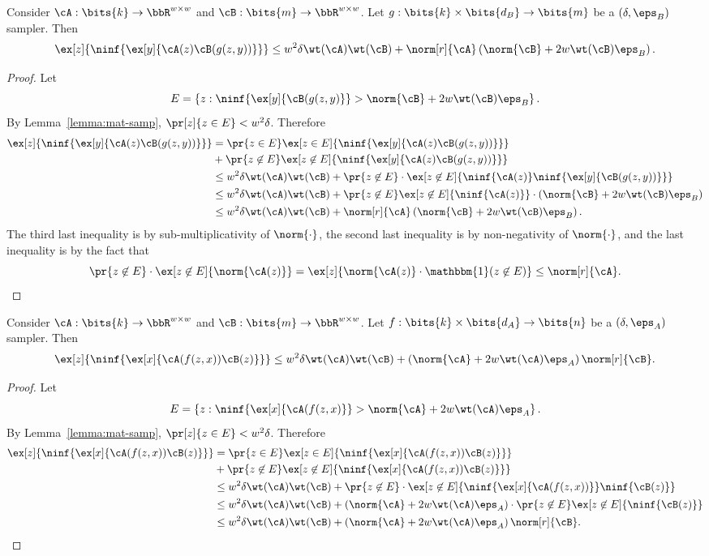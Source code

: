 \begin{lemma}\label{lemma:left}
Consider $\cA:\bits{k}\to\bbR^{w\times w}$ and $\cB:\bits{m}\to\bbR^{w\times w}$. Let $g:\bits{k}\times \bits{d_B}\to\bits{m}$ be a $(\delta,\eps_B)$ sampler. Then 
$$\ex[z]{\ninf{\ex[y]{\cA(z)\cB(g(z,y))}}}\le w^2\delta \wt(\cA)\wt(\cB)+\norm[r]{\cA}\left(\norm{\cB}+2w\wt(\cB)\eps_B\right).$$
\end{lemma}
\begin{proof}
Let $$E=\left\{z: \ninf{\ex[y]{\cB(g(z,y)}}> \norm{\cB}+2w\wt(\cB)\eps_B\right\}.$$
By Lemma~\ref{lemma:mat-samp}, $\pr[z]{z\in E}<w^2\delta$. Therefore 
\begin{align*}
\ex[z]{\ninf{\ex[y]{\cA(z)\cB(g(z,y))}}}
&=\pr{z\in E}\ex[z\in E]{\ninf{\ex[y]{\cA(z)\cB(g(z,y))}}} \\
&+ \pr{z\not\in E}\ex[z\not\in E]{\ninf{\ex[y]{\cA(z)\cB(g(z,y))}}}\\
&\le w^2\delta \wt(\cA)\wt(\cB)+\pr{z\not\in E}\cdot\ex[z\not\in E]{\ninf{\cA(z)}\ninf{\ex[y]{\cB(g(z,y))}}}\\
&\le w^2\delta \wt(\cA)\wt(\cB)+\pr{z\not\in E}\ex[z\not\in E]{\ninf{\cA(z)}}\cdot(\norm{\cB}+2w\wt(\cB)\eps_B)\\
&\le w^2\delta \wt(\cA)\wt(\cB)+\norm[r]{\cA}\left(\norm{\cB}+2w\wt(\cB)\eps_B\right).
\end{align*}
The third last inequality is by sub-multiplicativity of $\norm{\cdot}$, the second last inequality is by non-negativity of $\norm{\cdot}$, and the last inequality is by the fact that $$\pr{z\not\in E}\cdot\ex[z\not\in E]{\norm{\cA(z)}}=\ex[z]{\norm{\cA(z)}\cdot \mathbbm{1}(z\not\in E)}\le \norm[r]{\cA}.$$
\end{proof}
\begin{lemma}\label{lemma:right}
Consider $\cA:\bits{k}\to\bbR^{w\times w}$ and $\cB:\bits{m}\to\bbR^{w\times w}$. Let $f:\bits{k}\times \bits{d_A}\to\bits{n}$ be a $(\delta,\eps_A)$ sampler. Then 
$$\ex[z]{\ninf{\ex[x]{\cA(f(z,x))\cB(z)}}}\le w^2\delta \wt(\cA)\wt(\cB)+\left(\norm{\cA}+2w\wt(\cA)\eps_A\right)\norm[r]{\cB}.$$
\end{lemma}
\begin{proof}
Let $$E=\left\{z: \ninf{\ex[x]{\cA(f(z,x)}}> \norm{\cA}+2w\wt(\cA)\eps_A\right\}.$$
By Lemma~\ref{lemma:mat-samp}, $\pr[z]{z\in E}<w^2\delta$. Therefore 
\begin{align*}
\ex[z]{\ninf{\ex[x]{\cA(f(z,x))\cB(z)}}}
&=\pr{z\in E}\ex[z\in E]{\ninf{\ex[x]{\cA(f(z,x))\cB(z)}}} \\
&+ \pr{z\not\in E}\ex[z\not\in E]{\ninf{\ex[x]{\cA(f(z,x))\cB(z)}}}\\
&\le w^2\delta \wt(\cA)\wt(\cB)+\pr{z\not\in E}\cdot\ex[z\not\in E]{ \ninf{\ex[x]{\cA(f(z,x))}}\ninf{\cB(z)}}\\
&\le w^2\delta \wt(\cA)\wt(\cB)+(\norm{\cA}+2w\wt(\cA)\eps_A)\cdot \pr{z\not\in E}\ex[z\not\in E]{\ninf{\cB(z)}}\\
&\le w^2\delta \wt(\cA)\wt(\cB)+\left(\norm{\cA}+2w\wt(\cA)\eps_A\right)\norm[r]{\cB}.
\end{align*}
\end{proof}
